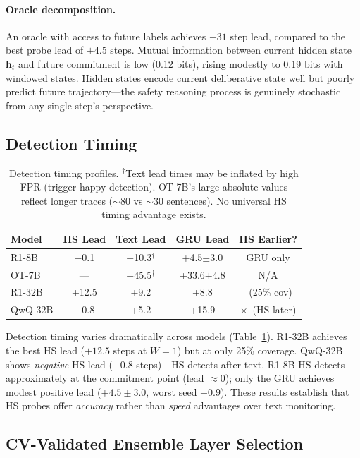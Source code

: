 \documentclass[11pt,a4paper]{article}
\newcommand{\cmark}{\checkmark}
\newcommand{\xmark}{$\times$}
\begin{document}
\paragraph{Oracle decomposition.}
An oracle with access to future labels achieves $+31$ step lead, compared to the best probe lead of $+4.5$ steps.
Mutual information between current hidden state $\mathbf{h}_t$ and future commitment is low (0.12 bits), rising modestly to 0.19 bits with windowed states.
Hidden states encode current deliberative state well but poorly predict future trajectory---the safety reasoning process is genuinely stochastic from any single step's perspective.

\subsection{Detection Timing}
\label{sec:timing}

\begin{table}[t]
\centering
\small
\begin{tabular}{lcccc}
\toprule
\textbf{Model} & \textbf{HS Lead} & \textbf{Text Lead} & \textbf{GRU Lead} & \textbf{HS Earlier?} \\
\midrule
R1-8B & $-$0.1 & +10.3$^\dagger$ & +4.5$\pm$3.0 & GRU only \\
OT-7B & --- & +45.5$^\dagger$ & +33.6$\pm$4.8 & N/A \\
R1-32B & +12.5 & +9.2 & +8.8 & \cmark~(25\% cov) \\
QwQ-32B & $-$0.8 & +5.2 & +15.9 & \xmark~(HS later) \\
\bottomrule
\end{tabular}
\caption{Detection timing profiles. $^\dagger$Text lead times may be inflated by high FPR (trigger-happy detection). OT-7B's large absolute values reflect longer traces ($\sim$80 vs $\sim$30 sentences). No universal HS timing advantage exists.}
\label{tab:timing}
\end{table}

Detection timing varies dramatically across models (Table~\ref{tab:timing}).
R1-32B achieves the best HS lead ($+12.5$ steps at $W=1$) but at only 25\% coverage.
QwQ-32B shows \emph{negative} HS lead ($-0.8$ steps)---HS detects after text.
R1-8B HS detects approximately at the commitment point (lead $\approx 0$); only the GRU achieves modest positive lead ($+4.5 \pm 3.0$, worst seed $+0.9$).
These results establish that HS probes offer \emph{accuracy} rather than \emph{speed} advantages over text monitoring.

\subsection{CV-Validated Ensemble Layer Selection}
\end{document}

